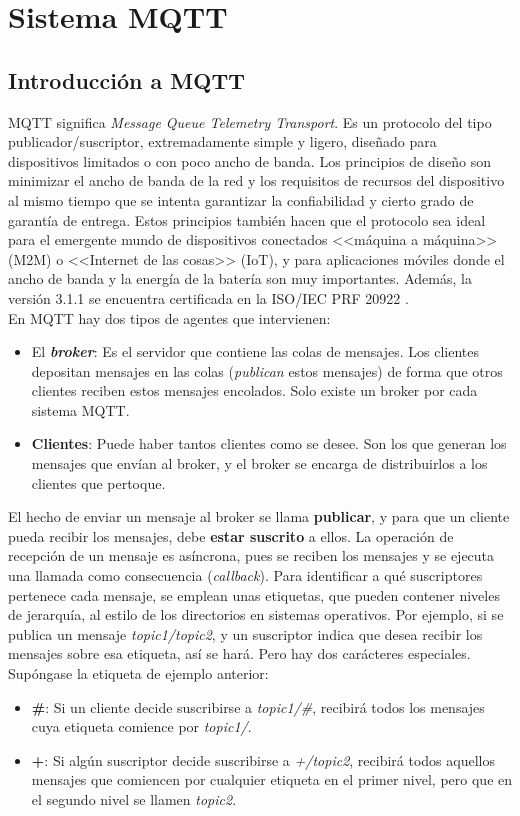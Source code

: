 \documentclass[12pt,spanish,listoffigures,listoftables]{tfgetsinf}
\begin{document}
\section{Sistema MQTT}

\subsection{Introducción a MQTT}

MQTT significa \textit{Message Queue Telemetry Transport}. Es un protocolo del tipo publicador/suscriptor, extremadamente simple y ligero, diseñado para dispositivos limitados o con poco ancho de banda. Los principios de diseño son minimizar el ancho de banda de la red y los requisitos de recursos del dispositivo al mismo tiempo que se intenta garantizar la confiabilidad y cierto grado de garantía de entrega. Estos principios también hacen que el protocolo sea ideal para el emergente mundo de dispositivos conectados <<máquina a máquina>> (M2M) o <<Internet de las cosas>> (IoT), y para aplicaciones móviles donde el ancho de banda y la energía de la batería son muy importantes. Además, la versión 3.1.1 se encuentra certificada en la ISO/IEC PRF 20922 \cite{MQTTISO}. \\

En MQTT hay dos tipos de agentes que intervienen: 
\begin{itemize}
	\item El \textbf{\textit{broker}}: Es el servidor que contiene las colas de mensajes. Los clientes depositan mensajes en las colas (\textit{publican} estos mensajes) de forma que otros clientes reciben estos mensajes encolados. Solo existe un broker por cada sistema MQTT.
	\item \textbf{Clientes}: Puede haber tantos clientes como se desee. Son los que generan los mensajes que envían al broker, y el broker se encarga de distribuirlos a los clientes que pertoque. 
\end{itemize}

El hecho de enviar un mensaje al broker se llama \textbf{publicar}, y para que un cliente pueda recibir los mensajes, debe \textbf{estar suscrito} a ellos. La operación de recepción de un mensaje es asíncrona, pues se reciben los mensajes y se ejecuta una llamada como consecuencia (\textit{callback}). Para identificar a qué suscriptores pertenece cada mensaje, se emplean unas etiquetas, que pueden contener niveles de jerarquía, al estilo de los directorios en sistemas operativos. Por ejemplo, si se publica un mensaje \textit{topic1/topic2}, y un suscriptor indica que desea recibir los mensajes sobre esa etiqueta, así se hará. Pero hay dos carácteres especiales. Supóngase la etiqueta de ejemplo anterior: 
\begin{itemize}
	\item \textbf{\#}: Si un cliente decide suscribirse a \textit{topic1/\#}, recibirá todos los mensajes cuya etiqueta comience por \textit{topic1/}.
	\item \textbf{+}: Si algún suscriptor decide suscribirse a \textit{+/topic2}, recibirá todos aquellos mensajes que comiencen por cualquier etiqueta en el primer nivel, pero que en el segundo nivel se llamen \textit{topic2}.
\end{itemize} 
\end{document}
